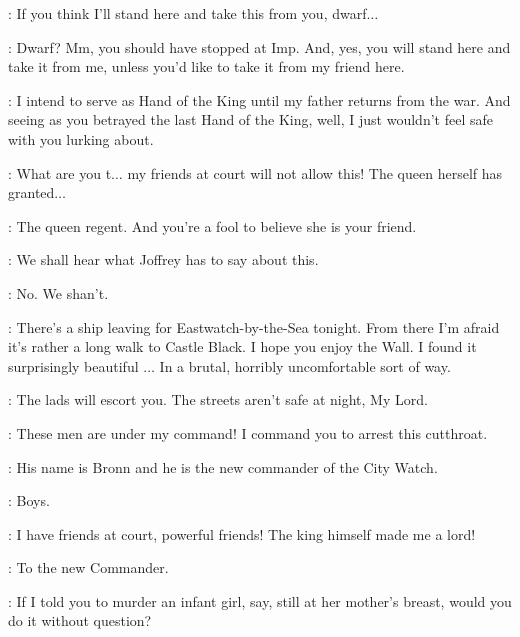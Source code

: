 \JANOSSLYNT: If you think I'll stand here and take this from you, dwarf$\ldots$

\TYRION: Dwarf? Mm, you should have stopped at Imp. And, yes, you will stand here and take it from me, unless you'd like to take it from my friend here.


\TYRION: I intend to serve as Hand of the King until my father returns from the war. And seeing as you betrayed the last Hand of the King, well, I just wouldn't feel safe with you lurking about.

\JANOSSLYNT: What are you t$\ldots$ my friends at court will not allow this! The queen herself has granted$\ldots$

\TYRION: The queen regent. And you're a fool to believe she is your friend.

\JANOSSLYNT: We shall hear what Joffrey has to say about this.

\TYRION: No.  We shan't.


\TYRION: There's a ship leaving for Eastwatch-by-the-Sea tonight. From there I'm afraid it's rather a long walk to Castle Black. I hope you enjoy the Wall. I found it surprisingly beautiful $\ldots$ In a brutal, horribly uncomfortable sort of way.

\BRONN: The lads will escort you. The streets aren't safe at night, My Lord.

\JANOSSLYNT: These men are under my command! I command you to arrest this cutthroat.

\TYRION: His name is Bronn and he is the new commander of the City Watch.

\BRONN: Boys.


\JANOSSLYNT: I have friends at court, powerful friends! The king himself made me a lord!


\TYRION: To the new Commander.


\TYRION: If I told you to murder an infant girl, say, still at her mother's breast, would you do it without question?


